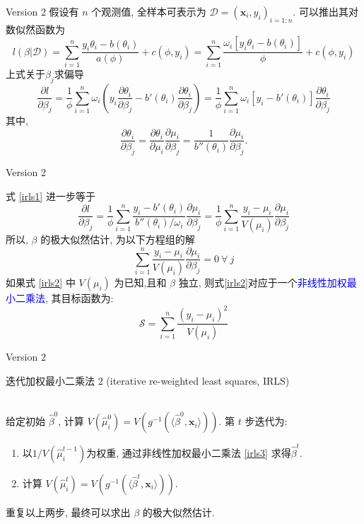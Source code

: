 \documentclass[professionalfont]{beamer}
\def\bx{\boldsymbol{x}}
\newcommand{\blue}[1]{\textcolor{blue}{#1}}
\begin{document}
\begin{frame}{Version 2}
	假设有 $n$ 个观测值, 全样本可表示为 $\mathcal{D}=({\bx_i}, y_i)_{i=1:n}$. 可以推出其对数似然函数为
	$$l(\beta|\mathcal{D})=\sum_{i=1}^{n}\frac{y_i\theta_i-b(\theta_i)}{a(\phi)}+c(\phi,y_i)=\sum_{i=1}^{n}\frac{\omega_i\left[y_i\theta_i-b(\theta_i)\right]}{\phi}+c(\phi,y_i)$$
	上式关于$\beta_j$求偏导
	\begin{equation}\label{irls1}
	\frac{\partial l}{\partial \beta_j}=\frac{1}{\phi}\sum_{i=1}^n\omega_i\left(y_i\frac{\partial\theta_i}{\partial \beta_j}-b'(\theta_i)\frac{\partial\theta_i}{\partial\beta_j}\right)=\frac{1}{\phi}\sum_{i=1}^n\omega_i\left[y_i-b'(\theta_i)\right]\frac{\partial\theta_i}{\partial \beta_j}
	\end{equation}
		其中, 
		$$\frac{\partial \theta_i}{\partial \beta_j}=\frac{\partial \theta_i}{\partial \mu_i}\frac{\partial \mu_i}{\partial \beta_j}=\frac{1}{b''(\theta_i)}\frac{\partial \mu_i}{\partial \beta_j}.$$
\end{frame}
\begin{frame}{Version 2}

	式 \eqref{irls1} 进一步等于
	\begin{equation}
	\frac{\partial l}{\partial \beta_j}=\frac{1}{\phi}\sum_{i=1}^n\frac{y_i-b'(\theta_i)}{b''(\theta_i)/\omega_i}\frac{\partial\mu_i}{\partial \beta_j}=\frac{1}{\phi}\sum_{i=1}^n\frac{y_i-\mu_i}{V(\mu_i)}\frac{\partial\mu_i}{\partial \beta_j}
		\end{equation}
	所以, $\beta$ 的极大似然估计, 为以下方程组的解
	\begin{equation}\label{irls2}
	\sum_{i=1}^n\frac{y_i-\mu_i}{V(\mu_i)}\frac{\partial\mu_i}{\partial \beta_j}=0 ~ \forall ~ j
	\end{equation}
		如果式 \eqref{irls2} 中 $V(\mu_i)$ 为已知,且和 $\beta$ 独立, 则式\eqref{irls2}对应于一个\blue{非线性加权最小二乘法}, 其目标函数为: 
		\begin{equation}\label{irls3}
		\mathcal{S}=\sum_{i=1}^n\frac{(y_i-\mu_i)^2}{V(\mu_i)}
		\end{equation}
\end{frame}

\begin{frame}{Version 2}

迭代加权最小二乘法 2 (iterative re-weighted least squares, IRLS)\\

~

给定初始 $\hat{\beta}^0$, 计算 $V(\hat{\mu}^0_i)=V(g^{-1}(\langle\hat{\beta}^0,\bx_i\rangle))$. 第 $t$ 步迭代为:
\begin{enumerate}
	\item 以$1/V(\hat{\mu}_i^{t-1})$为权重, 通过非线性加权最小二乘法 \eqref{irls3} 求得$\hat{\beta}^t$. 
	\item 计算 $V(\hat{\mu}_i^t)=V(g^{-1}(\langle\hat{\beta}^t,\bx_i\rangle))$. 
\end{enumerate}
 重复以上两步, 最终可以求出 $\beta$ 的极大似然估计.
\end{frame}
\end{document}
